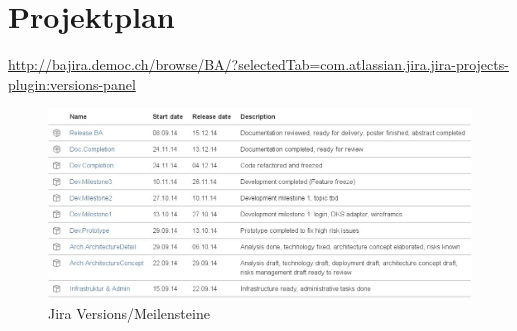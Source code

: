 \chapter*{Projektplan}
	
	\hyperlink{http://bajira.democ.ch/browse/BA/?selectedTab=com.atlassian.jira.jira-projects-plugin:versions-panel}{http://bajira.democ.ch/browse/BA/?selectedTab=com.atlassian.jira.jira-projects-plugin:versions-panel}


	\begin{figure}[H]
		\includegraphics[width=\textwidth]{projectPlan/media/img/jiraVersions.jpg}
		\centering
		\caption{Jira Versions/Meilensteine}
		\label{fig:jiraVersions}
	\end{figure}